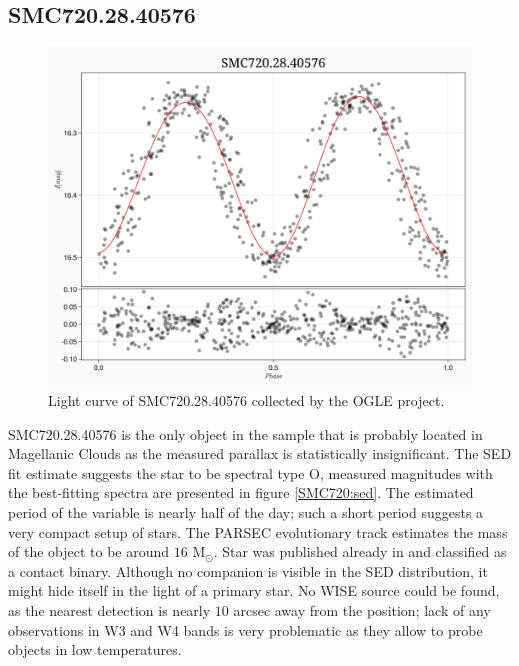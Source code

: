 \documentclass{pracalicmgr}
\begin{document}
\subsection{SMC720.28.40576}
\begin{figure}[H]
      \centering
      \includegraphics[scale=0.35]{plots/SMC720.28.40576_phase.png}
      \caption{Light curve of SMC720.28.40576 collected by the OGLE project.}
      \label{SMC720:lc}
\end{figure}
SMC720.28.40576 is the only object in the sample that is probably located in Magellanic Clouds as the measured parallax is statistically insignificant.
The SED fit estimate suggests the star to be spectral type O, measured magnitudes with the best-fitting spectra are presented in figure \ref{SMC720:sed}.
The estimated period of the variable is nearly half of the day; such a short period suggests a very compact setup of stars.
The PARSEC evolutionary track estimates the mass of the object to be around $16$  $\textrm{M}_{\odot}$.
Star was published already in \citet{pawlak_ogle_2016} and classified as a contact binary. Although
no companion is visible in the SED distribution, it might hide itself in the light of a primary star.
No WISE source could be found, as the nearest detection is nearly $10$ arcsec away from the position; lack of any observations
in W3 and W4 bands is very problematic as they allow to probe objects in low temperatures.
\end{document}
